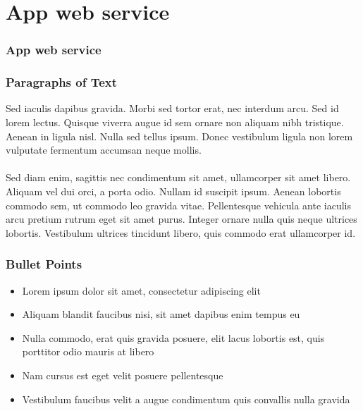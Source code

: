 \documentclass{beamer}
\begin{document}

\section{App web service}


\begin{frame}
\frametitle{App web service}
\end{frame}


\begin{frame}
\frametitle{Paragraphs of Text}
Sed iaculis dapibus gravida. Morbi sed tortor erat, nec interdum arcu. Sed id lorem lectus. Quisque viverra augue id sem ornare non aliquam nibh tristique. Aenean in ligula nisl. Nulla sed tellus ipsum. Donec vestibulum ligula non lorem vulputate fermentum accumsan neque mollis.\\~\\

Sed diam enim, sagittis nec condimentum sit amet, ullamcorper sit amet libero. Aliquam vel dui orci, a porta odio. Nullam id suscipit ipsum. Aenean lobortis commodo sem, ut commodo leo gravida vitae. Pellentesque vehicula ante iaculis arcu pretium rutrum eget sit amet purus. Integer ornare nulla quis neque ultrices lobortis. Vestibulum ultrices tincidunt libero, quis commodo erat ullamcorper id.
\end{frame}


\begin{frame}
\frametitle{Bullet Points}
\begin{itemize}
\item Lorem ipsum dolor sit amet, consectetur adipiscing elit
\item Aliquam blandit faucibus nisi, sit amet dapibus enim tempus eu
\item Nulla commodo, erat quis gravida posuere, elit lacus lobortis est, quis porttitor odio mauris at libero
\item Nam cursus est eget velit posuere pellentesque
\item Vestibulum faucibus velit a augue condimentum quis convallis nulla gravida
\end{itemize}
\end{frame}
\end{document}
